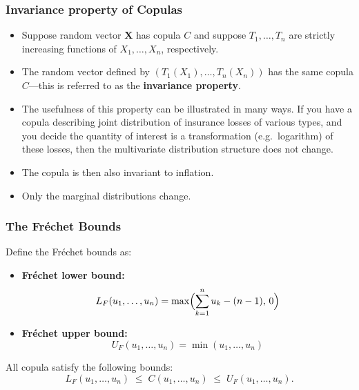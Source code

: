 \documentclass[11pt]{article}
\newcommand{\noi}{\noindent}
\begin{document}
\subsubsection{Invariance property of Copulas}
\noi
\begin{itemize}
    \item Suppose random vector $\mathbf{X}$ has copula $C$ and suppose $T_1,\dots,T_n$ are strictly increasing functions of $X_1,\dots,X_n$, respectively.
    \item The random vector defined by $(T_1(X_1),\dots,T_n(X_n))$ has the same copula $C$—this is referred to as the \textbf{invariance property}.
    \item The usefulness of this property can be illustrated in many ways. If you have a copula describing joint distribution of insurance losses of various types, and you decide the quantity of interest is a transformation (e.g.\ logarithm) of these losses, then the multivariate distribution structure does not change.
    \item The copula is then also invariant to inflation.
    \item Only the marginal distributions change.
\end{itemize}

\subsubsection{The Fr\'echet Bounds}
\noi Define the Fréchet bounds as:
\begin{itemize}
    \item \textbf{Fréchet lower bound:} 
    \[
        L_F(u_1,\dots,u_n)
        =\max\Bigl(\sum_{k=1}^n u_k - (n-1),\,0\Bigr)
    \]
    \item \textbf{Fréchet upper bound:} 
    \[
        U_F(u_1,\dots,u_n)
        =\min(u_1,\dots,u_n)
    \]
\end{itemize}
\noi All copula satisfy the following bounds:
\[
    L_F(u_1,\dots,u_n)\;\le\;C(u_1,\dots,u_n)\;\le\;U_F(u_1,\dots,u_n).
\]
\end{document}
